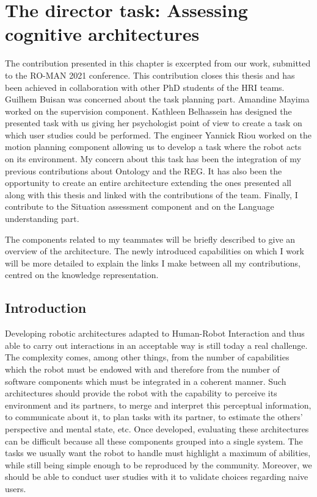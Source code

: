 \ifdefined{}
\else
\setcounter{chapter}{8} %
\dominitoc
\faketableofcontents
\fi

\chapter{The director task: Assessing cognitive architectures}
\minitoc

The contribution presented in this chapter is excerpted from our work, submitted to the RO-MAN 2021 conference. This contribution closes this thesis and has been achieved in collaboration with other PhD students of the HRI teams. Guilhem Buisan was concerned about the task planning part. Amandine Mayima worked on the supervision component. Kathleen Belhassein has designed the presented task with us giving her psychologist point of view to create a task on which user studies could be performed. The engineer Yannick Riou worked on the motion planning component allowing us to develop a task where the robot acts on its environment. My concern about this task has been the integration of my previous contributions about Ontology and the REG. It has also been the opportunity to create an entire architecture extending the ones presented all along with this thesis and linked with the contributions of the team. Finally, I contribute to the Situation assessment component and on the Language understanding part.

The components related to my teammates will be briefly described to give an overview of the architecture. The newly introduced capabilities on which I work will be more detailed to explain the links I make between all my contributions, centred on the knowledge representation.

\section{Introduction}

Developing robotic architectures adapted to Human-Robot Interaction and thus able to carry out interactions in an acceptable way is still today a real challenge. The complexity comes, among other things, from the number of capabilities which the robot must be endowed with and therefore from the number of software components which must be integrated in a coherent manner. Such architectures should provide the robot with the capability to perceive its environment and its partners, to merge and interpret this perceptual information, to communicate about it, to plan tasks with its partner, to estimate the others' perspective and mental state, etc. Once developed, evaluating these architectures can be difficult because all these components grouped into a single system. The tasks we usually want the robot to handle must highlight a maximum of abilities, while still being simple enough to be reproduced by the community. Moreover, we should be able to conduct user studies with it to validate choices regarding naive users.

